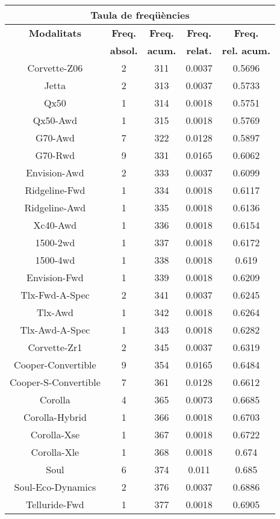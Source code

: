\begin{center}
\begin{tabular}{|c|c|c|c|@{}c@{}|}
\hline
\multicolumn{5}{|c|}{\bf Taula de freq\" u\`encies} \\ 
\hline
{\bf Modalitats} & {\bf Freq.} & {\bf Freq.} & {\bf Freq.} & {\bf Freq.} \\ 
 & {\bf absol.} & {\bf acum.} & {\bf relat.} & {\bf rel. acum.} \\ 
\hline
\hline
Corvette-Z06 & 2 & 311 & 0.0037 & 0.5696 \\ 
Jetta & 2 & 313 & 0.0037 & 0.5733 \\ 
Qx50 & 1 & 314 & 0.0018 & 0.5751 \\ 
Qx50-Awd & 1 & 315 & 0.0018 & 0.5769 \\ 
G70-Awd & 7 & 322 & 0.0128 & 0.5897 \\ 
G70-Rwd & 9 & 331 & 0.0165 & 0.6062 \\ 
Envision-Awd & 2 & 333 & 0.0037 & 0.6099 \\ 
Ridgeline-Fwd & 1 & 334 & 0.0018 & 0.6117 \\ 
Ridgeline-Awd & 1 & 335 & 0.0018 & 0.6136 \\ 
Xc40-Awd & 1 & 336 & 0.0018 & 0.6154 \\ 
1500-2wd & 1 & 337 & 0.0018 & 0.6172 \\ 
1500-4wd & 1 & 338 & 0.0018 & 0.619 \\ 
Envision-Fwd & 1 & 339 & 0.0018 & 0.6209 \\ 
Tlx-Fwd-A-Spec & 2 & 341 & 0.0037 & 0.6245 \\ 
Tlx-Awd & 1 & 342 & 0.0018 & 0.6264 \\ 
Tlx-Awd-A-Spec & 1 & 343 & 0.0018 & 0.6282 \\ 
Corvette-Zr1 & 2 & 345 & 0.0037 & 0.6319 \\ 
Cooper-Convertible & 9 & 354 & 0.0165 & 0.6484 \\ 
Cooper-S-Convertible & 7 & 361 & 0.0128 & 0.6612 \\ 
Corolla & 4 & 365 & 0.0073 & 0.6685 \\ 
Corolla-Hybrid & 1 & 366 & 0.0018 & 0.6703 \\ 
Corolla-Xse & 1 & 367 & 0.0018 & 0.6722 \\ 
Corolla-Xle & 1 & 368 & 0.0018 & 0.674 \\ 
Soul & 6 & 374 & 0.011 & 0.685 \\ 
Soul-Eco-Dynamics & 2 & 376 & 0.0037 & 0.6886 \\ 
Telluride-Fwd & 1 & 377 & 0.0018 & 0.6905 \\ 

\end{tabular}
\end{center}
